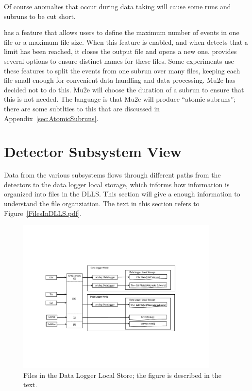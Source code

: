 Of course anomalies that occur during data taking will cause some runs
and subruns to be cut short.


\art has a feature that allows users to define the maximum
number of events in one file or a maximum file size.
When this feature is enabled,
and when \art detects that a limit has been reached,
it closes the output file and opens a new one.
\art provides several options to ensure distinct names for these files.
Some experiments use these features to split the events from one
subrun over many files,
keeping each file small enough for convenient data handling and data processing.
Mu2e has decided not to do this.
Mu2e will choose the duration of a subrun to ensure that this is not needed.
The language is that Mu2e will produce ``atomic subruns''; there are some
subtlties to this that are discussed in Appendix~\ref{sec:AtomicSubruns}.

\section{Detector Subsystem View}
\label{ssec:detectorSubsystemView}

Data from the various subsystems flows through different paths from the
detectors to the data logger local storage, which informs how
information is organized into files in the DLLS.  This section will
give a enough information to understand the file organziation.
The text in this section refers to Figure~\ref{FilesInDLLS.pdf}.

\begin{figure}[tbp]
\centering
\includegraphics[width=0.9\textwidth]{figures/FilesInDLLS.pdf}
\caption[Files in the DLLS]{
  Files in the Data Logger Local Store; the figure is described in the text.}
\label{fig:filesDLLS}
\end{figure}


